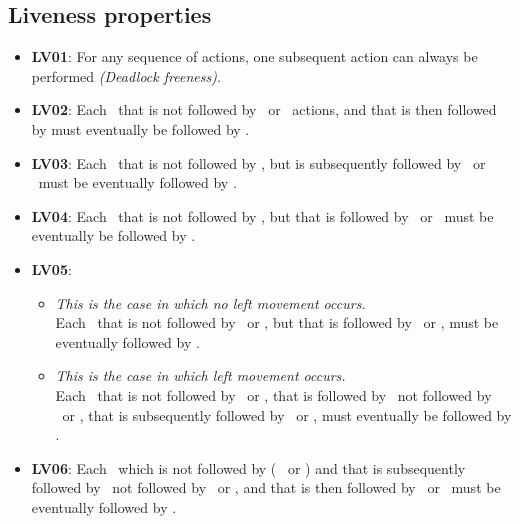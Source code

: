 \subsection{Liveness properties}
\begin{itemize}
    \item \textbf{LV01}: For any sequence of actions, one subsequent action can always be performed \emph{(Deadlock freeness)}.

    \item \textbf{LV02}:
    Each \leftmostReached\ that is not followed by \motorRight\ or \emergencyMode\ actions, and that is then followed by \emergencyMode must eventually be followed by \releaseHorizontalBrake.

    \item \textbf{LV03}: Each \emergencyMode\ that is not followed by \normalMode, but is subsequently followed by \pressResume\ or \tapResume\ must be eventually followed by \normalMode.

    \item \textbf{LV04}: Each \dock\ that is not followed by \undock, but that is followed by \tapStop\ or \pressStop\, must be eventually be followed by \emergencyMode.

    \item \textbf{LV05}:
    \begin{itemize}
        \item \textit{This is the case in which no left movement occurs.}\\
        Each \dock\ that is not followed by \undock\ or \motorLeft, but that is followed by \tapUndock\ or \pressUndock, must be eventually followed by \undock.

        \item \textit{This is the case in which left movement occurs.}\\
        Each \dock\ that is not followed by \undock\ or \motorLeft, that is followed by \rightmostReached\ not followed by \undock\ or \motorLeft, that is subsequently followed by \tapUndock\ or \pressUndock, must eventually be followed by \undock.
    \end{itemize}
    \item \textbf{LV06}: Each \setStandardHeight\ which is not followed by ( \resetStandardHeight\ or \emergencyMode) and that is subsequently followed by \undock\ not followed by \dock\ or \resetStandardHeight, and that is then followed by \tapReset\ or \pressReset\, must be eventually followed by \resetStandardHeight.


\end{itemize}
